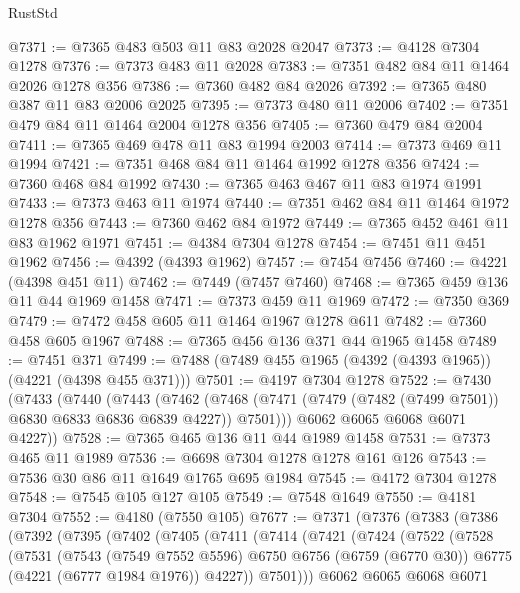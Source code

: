 \begin{lexlean}{RustStd}
\begin{coremodule}
{\begin{coremodule}
{{{{{{{{{{{{{{{{{{{{{{{{{{{{{{{@7371 := @7365 @483 @503 @11 @83 @2028 @2047
@7373 := @4128 @7304 @1278
@7376 := @7373 @483 @11 @2028
@7383 := @7351 @482 @84 @11 @1464 @2026 @1278 @356
@7386 := @7360 @482 @84 @2026
@7392 := @7365 @480 @387 @11 @83 @2006 @2025
@7395 := @7373 @480 @11 @2006
@7402 := @7351 @479 @84 @11 @1464 @2004 @1278 @356
@7405 := @7360 @479 @84 @2004
@7411 := @7365 @469 @478 @11 @83 @1994 @2003
@7414 := @7373 @469 @11 @1994
@7421 := @7351 @468 @84 @11 @1464 @1992 @1278 @356
@7424 := @7360 @468 @84 @1992
@7430 := @7365 @463 @467 @11 @83 @1974 @1991
@7433 := @7373 @463 @11 @1974
@7440 := @7351 @462 @84 @11 @1464 @1972 @1278 @356
@7443 := @7360 @462 @84 @1972
@7449 := @7365 @452 @461 @11 @83 @1962 @1971
@7451 := @4384 @7304 @1278
@7454 := @7451 @11 @451 @1962
@7456 := @4392 (@4393 @1962)
@7457 := @7454 @7456
@7460 := @4221 (@4398 @451 @11)
@7462 := @7449 (@7457 @7460)
@7468 := @7365 @459 @136 @11 @44 @1969 @1458
@7471 := @7373 @459 @11 @1969
@7472 := @7350 @369
@7479 := @7472 @458 @605 @11 @1464 @1967 @1278 @611
@7482 := @7360 @458 @605 @1967
@7488 := @7365 @456 @136 @371 @44 @1965 @1458
@7489 := @7451 @371
@7499 := @7488 (@7489 @455 @1965 (@4392 (@4393 @1965)) (@4221 (@4398 @455 @371)))
@7501 := @4197 @7304 @1278
@7522 := @7430
    (@7433
      (@7440
        (@7443
          (@7462 (@7468 (@7471 (@7479 (@7482 (@7499 @7501)) @6830 @6833 @6836 @6839 @4227)) @7501)))
        @6062
        @6065
        @6068
        @6071
        @4227))
@7528 := @7365 @465 @136 @11 @44 @1989 @1458
@7531 := @7373 @465 @11 @1989
@7536 := @6698 @7304 @1278 @1278 @161 @126
@7543 := @7536 @30 @86 @11 @1649 @1765 @695 @1984
@7545 := @4172 @7304 @1278
@7548 := @7545 @105 @127 @105
@7549 := @7548 @1649
@7550 := @4181 @7304
@7552 := @4180 (@7550 @105)
@7677 := @7371
    (@7376
      (@7383
        (@7386
          (@7392
            (@7395
              (@7402
                (@7405
                  (@7411
                    (@7414
                      (@7421
                        (@7424
                          (@7522
                            (@7528
                              (@7531
                                (@7543
                                  (@7549 @7552 @5596)
                                  @6750
                                  @6756
                                  (@6759 (@6770 @30))
                                  @6775
                                  (@4221 (@6777 @1984 @1976))
                                  @4227))
                              @7501)))
                        @6062
                        @6065
                        @6068
                        @6071
}}}}}}}}}}}}}}}}}}}}}}}}}}}}}}}
\end{coremodule}}
\end{coremodule}
\end{lexlean}
